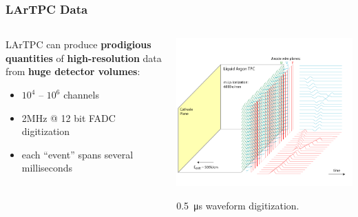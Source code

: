 \begin{frame}
  \frametitle{LArTPC Data}
  
  \vspace{-10mm}

  \begin{columns}
    \begin{column}{0.8\textwidth}
      LArTPC can produce \textbf{prodigious quantities} of \textbf{high-resolution} data from \textbf{huge detector volumes}:
      \begin{itemize}
      \item $10^4$ -- $10^6$ channels
      \item 2MHz @ 12 bit FADC digitization
      \item each ``event'' spans several milliseconds
      \end{itemize}
    \end{column}
    \begin{column}{0.2\textwidth}
      \begin{center}
        \includegraphics[width=\textwidth,trim=13cm 0cm 0cm 0cm,clip]{signal-15.png}

        \scriptsize \SI{0.5}{\micro\second} waveform digitization.
      \end{center}
    \end{column}
  \end{columns}

  \vspace{-5mm}


\end{frame}
